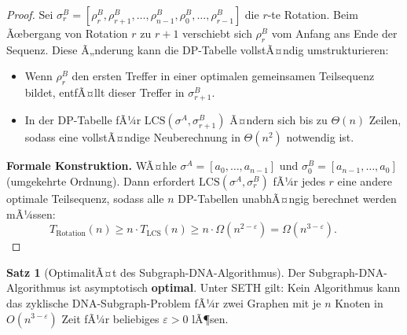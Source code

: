 ﻿\documentclass[a4paper,12pt]{article}
\theoremstyle{definition}
\newtheorem{satz}{Satz}
\begin{document}
\begin{proof}
    Sei $\sigma^B_r = [\rho_r^B, \rho_{r+1}^B, \ldots, \rho_{n-1}^B,
    \rho_0^B, \ldots, \rho_{r-1}^B]$ die $r$-te Rotation.
    Beim Ãœbergang von Rotation $r$ zu $r+1$ verschiebt sich $\rho_r^B$
    vom Anfang ans Ende der Sequenz. Diese Ã„nderung kann die DP-Tabelle
    vollstÃ¤ndig umstrukturieren:
    \begin{itemize}
        \item Wenn $\rho_r^B$ den ersten Treffer in einer optimalen gemeinsamen
              Teilsequenz bildet, entfÃ¤llt dieser Treffer in $\sigma^B_{r+1}$.
        \item In der DP-Tabelle fÃ¼r $\mathrm{LCS}(\sigma^A, \sigma^B_{r+1})$
              Ã¤ndern sich bis zu $\Theta(n)$ Zeilen, sodass eine vollstÃ¤ndige
              Neuberechnung in $\Theta(n^2)$ notwendig ist.
    \end{itemize}

    \textbf{Formale Konstruktion.}
    WÃ¤hle $\sigma^A = [a_0, \ldots, a_{n-1}]$ und
    $\sigma^B_0 = [a_{n-1}, \ldots, a_0]$ (umgekehrte Ordnung).
    Dann erfordert $\mathrm{LCS}(\sigma^A, \sigma^B_r)$ fÃ¼r jedes $r$ eine
    andere optimale Teilsequenz, sodass alle $n$ DP-Tabellen unabhÃ¤ngig
    berechnet werden mÃ¼ssen:
    \[
        T_{\text{Rotation}}(n) \geq n \cdot T_{\mathrm{LCS}}(n)
        \geq n \cdot \Omega(n^{2-\varepsilon}) = \Omega(n^{3-\varepsilon}).
        \qquad 
    \]
\end{proof}

\begin{satz}[OptimalitÃ¤t des Subgraph-DNA-Algorithmus]
    \label{satz:optimalitaet}
    Der Subgraph-DNA-Algorithmus ist asymptotisch \textbf{optimal}.
    Unter SETH gilt: Kein Algorithmus kann das zyklische DNA-Subgraph-Problem
    fÃ¼r zwei Graphen mit je $n$ Knoten in $O(n^{3-\varepsilon})$ Zeit fÃ¼r
    beliebiges $\varepsilon > 0$ lÃ¶sen.
\end{satz}
\end{document}
